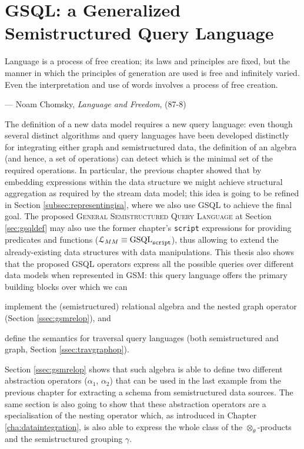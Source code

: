 \chapter{GSQL: a Generalized Semistructured Query Language}\label{cha:NGQL}
\epigraph{Language is a process of free creation; its laws and principles are fixed, but the manner in which the principles of generation are used is free and infinitely varied. Even the interpretation and use of words involves a process of free creation.}{--- Noam Chomsky, \textit{Language and Freedom}, (87-8)}


The definition of a new data model requires a new query language: even though several distinct algorithms and query languages have been developed distinctly for integrating either graph and semistructured data, the definition of an algebra (and hence, a set of operations) can detect which is the minimal set of the required operations. In particular, the previous chapter showed that by embedding expressions within the data structure we might achieve structural aggregation as required by the stream data model; this idea is going to be refined in Section \ref{subsec:representingisa}, where we also use GSQL to achieve the final goal. The proposed \textsc{General Semistructured Query Language} at Section \ref{sec:gsqldef} may also use the former chapter's \texttt{script} expressions for providing predicates and functions ($\langg_{\metamodel}\equiv \textup{GSQL}_{\texttt{script}}$), thus  allowing to extend the already-existing data structures with data manipulations.  This thesis also shows that the proposed GSQL operators express all the possible queries over different data models when represented in GSM:  this query language offers the primary building blocks over which we can \begin{mylist}
	\item implement the (semistructured) relational algebra and the nested graph operator (Section \vref{ssec:gsmrelop}), and
	\item define the semantics for traversal query languages (both semistructured and graph, Section \vref{ssec:travgraphop}).
\end{mylist} Section \vref{ssec:gsmrelop} shows that such algebra is able to define two different abstraction operators ($\alpha_1$, $\alpha_2$) that can be used in the last example from the previous chapter for extracting a schema from semistructured data sources. The same section is also going to show that these abstraction operators are a specialisation of the nesting operator which, as introduced in Chapter \ref{cha:dataintegration}, is also able to express the whole class of the $\otimes_\theta$-products and the semistructured grouping $\gamma$.

